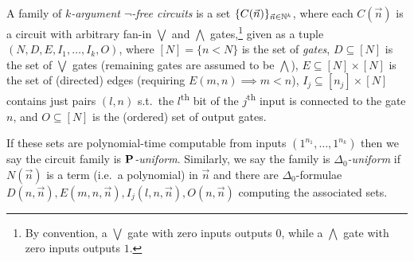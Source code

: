 \documentclass{lmcs}
\begin{document}
\begin{definition}
	\label{dfn:circuit-uniformity}
	A family of \emph{$k$-argument $\neg$-free circuits} is a set $\{ C(\vec n) \}_{\vec n \in \mathbb{N}^k}$, where each $C(\vec n)$ is a circuit with arbitrary fan-in $\bigvee$ and $\bigwedge$ gates,\footnote{By convention, a $\bigvee$ gate with zero inputs outputs $0$, while a $\bigwedge$ gate with zero inputs outputs $1$.} 
	given as a tuple $(N, D , E, I_1 , \dots , I_k, O )$, where $[N] = \{n<N \}$ is the set of \emph{gates}, $D \subseteq [N]$ is the set of $\bigvee$ gates (remaining gates are assumed to be $\bigwedge$), $E\subseteq [N]\times [N]$ is the set of (directed) edges (requiring $E(m,n) \implies m<n$), $I_j \subseteq [n_j] \times [N]$ contains just pairs $(l,n)$ s.t.\ the $l$\textsuperscript{th} bit of the $j$\textsuperscript{th} input is connected to the gate $n$, and $O\subseteq [N]$ is the (ordered) set of output gates.
	
	
	If these sets are polynomial-time computable from inputs $(1^{n_1} , \dots , 1^{n_k})$ then we say the circuit family is \emph{$\mathbf{P}$-uniform}.
	Similarly, we say the family is \emph{$\Delta_0$-uniform} if $N(\vec n)$ is a term (i.e.\ a polynomial) in $\vec n$ and there are $\Delta_0$-formulae $D(n, \vec n), E(m,n, \vec n), I_j (l,n, \vec n), O(n, \vec n)$ computing the associated sets.
	
	
\end{definition}
\end{document}
